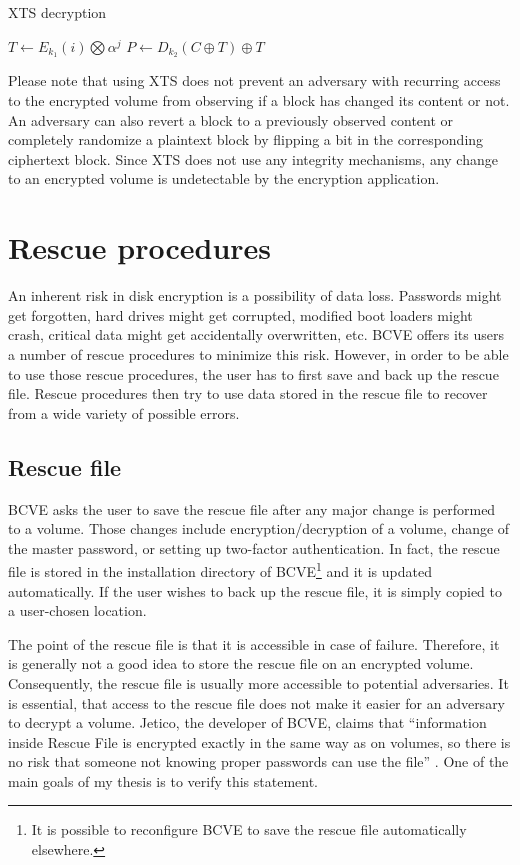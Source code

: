 \documentclass[thesis=B,english]{FITthesis}[2012/10/20]
\begin{document}
	\begin{algorithm}
		\caption{XTS decryption
			\label{alg:xtsd}}
		\begin{algorithmic}[1]
			\State $T\gets E_{k_1}(i) \bigotimes \alpha ^ j $
			\State $P\gets D_{k_2}(C \oplus T) \oplus T $
		\end{algorithmic}
	\end{algorithm}
	
	Please note that using XTS does not prevent an adversary with recurring access to the encrypted volume from observing if a block has changed its content or not. An adversary can also revert a block to a previously observed content or completely randomize a plaintext block by flipping a bit in the corresponding ciphertext block. Since XTS does not use any integrity mechanisms, any change to an encrypted volume is undetectable by the encryption application.
	
	\section{Rescue procedures}
	
	An inherent risk in disk encryption is a possibility of data loss. Passwords might get forgotten, hard drives might get corrupted, modified boot loaders might crash, critical data might get accidentally overwritten, etc. BCVE offers its users a number of rescue procedures to minimize this risk. However, in order to be able to use those rescue procedures, the user has to first save and back up the rescue file. Rescue procedures then try to use data stored in the rescue file to recover from a wide variety of possible errors.
	
	\subsection{Rescue file}
	BCVE asks the user to save the rescue file after any major change is performed to a volume. Those changes include encryption/decryption of a volume, change of the master password, or setting up two-factor authentication. In fact, the rescue file is stored in the installation directory of BCVE\footnote{It is possible to reconfigure BCVE to save the rescue file automatically elsewhere.} and it is updated automatically. If the user wishes to back up the rescue file, it is simply copied to a user-chosen location. 
	
	\label{subsec:accessible}
	
	The point of the rescue file is that it is accessible in case of failure. Therefore, it is generally not a good idea to store the rescue file on an encrypted volume. Consequently, the rescue file is usually more accessible to potential adversaries. It is essential, that access to the rescue file does not make it easier for an adversary to decrypt a volume. Jetico, the developer of BCVE, claims that ``information inside Rescue File is encrypted exactly in the same way as on volumes, so there is no risk that someone	not knowing proper passwords can use the file'' \cite{bcve_help}. One of the main goals of my thesis is to verify this statement.
	
\end{document}
